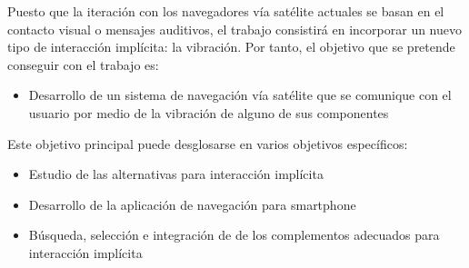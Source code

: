 Puesto que la iteración con los navegadores vía satélite actuales se basan en el contacto
visual o mensajes auditivos, el trabajo consistirá en incorporar un nuevo tipo de
interacción implícita: la vibración. Por tanto, el objetivo que se pretende conseguir con
el trabajo es:

\begin{itemize}
\item Desarrollo de un sistema de navegación vía satélite que se
  comunique con el usuario por medio de la vibración de alguno de sus componentes
\end{itemize}

Este objetivo principal puede desglosarse en varios objetivos específicos:

\begin{itemize}
\item Estudio de las alternativas para interacción implícita
\item Desarrollo de la aplicación de navegación para smartphone
\item Búsqueda, selección e integración de de los complementos adecuados para
  interacción implícita
\end{itemize}



